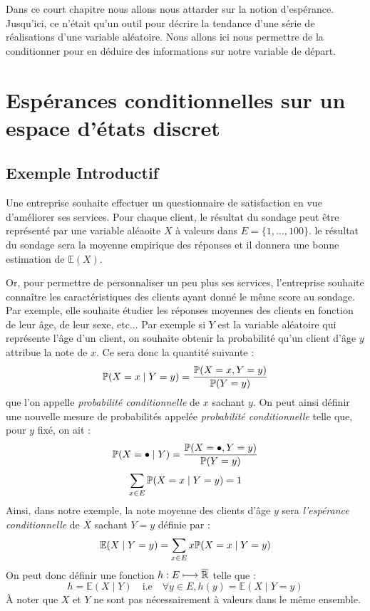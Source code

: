 
\minitoc


Dans ce court chapitre nous allons nous attarder sur la notion d'espérance. 
Jusqu'ici, ce n'était qu'un outil pour décrire la tendance d'une série 
de réalisations d'une variable aléatoire. Nous allons ici nous permettre de la conditionner 
pour en déduire des informations sur notre variable de départ. 


\section{Espérances conditionnelles sur un espace d'états discret}

\subsection{Exemple Introductif}

Une entreprise souhaite effectuer un questionnaire de satisfaction en vue d'améliorer ses services. 
Pour chaque client, le résultat du sondage peut être représenté par une variable aléaoite $X$ 
à valeurs dans $E = \{1, \dots, 100\}$. le résultat du sondage sera la moyenne empirique des 
réponses et il donnera une bonne estimation de $ \mathbb{E}(X)$. 

Or, pour permettre de personnaliser un peu plus ses services, l'entreprise souhaite connaître 
les caractéristiques des clients ayant donné le même score au sondage. Par exemple, elle souhaite 
étudier les réponses moyennes des clients en fonction de leur âge, de leur sexe, etc... Par exemple 
si $Y$ est la variable aléatoire qui représente l'âge d'un client, on souhaite obtenir la probabilité 
qu'un client d'âge $y$ attribue la note de $x$. Ce sera donc la quantité suivante : 
    $$ \mathbb{P}(X = x \mid Y = y) = \frac{ \mathbb{P}(X = x, Y = y) }{ \mathbb{P}(Y = y) } $$
que l'on appelle \emph{probabilité conditionnelle} de $x$ sachant $y$. On peut ainsi définir 
une nouvelle mesure de probabilités appelée \emph{probabilité conditionnelle} telle que, pour $y$ 
fixé, on ait : 
    $$ \mathbb{P}(X = \bullet \mid Y) = \frac{ \mathbb{P}(X = \bullet, Y = y) }{ \mathbb{P}(Y = y) } $$ 
    $$ \sum_{x \in E} \mathbb{P}(X = x \mid Y = y) = 1 $$  
Ainsi, dans notre exemple, la note moyenne des clients d'âge $y$ sera \emph{l'espérance conditionnelle} de 
$X$ sachant $Y = y$ définie par : 
    $$ \mathbb{E}(X \mid Y = y) = \sum_{x \in E} x \mathbb{P}(X = x \mid Y = y) $$
On peut donc définir une fonction $h : E \longmapsto \overline{\mathbb{R}}$ telle que : 
    $$ h = \mathbb{E}(X \mid Y) \quad \text{i.e} \quad \forall y \in E, h(y) = \mathbb{E}(X \mid Y = y) $$   
À noter que $X$ et $Y$ ne sont pas nécessairement à valeurs dans le même ensemble. 

